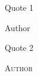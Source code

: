\begin{vplace}[0.7]

\setlength{\epigraphwidth}{0.72\textwidth}

\epigraph{Quote 1}{Author}

\vspace{1cm}

\epigraph{Quote 2}{\textsc{Author}}


\end{vplace}